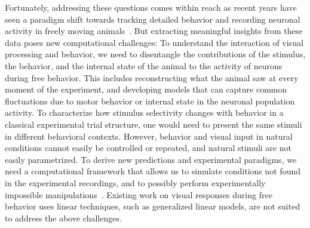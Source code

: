 \documentclass[COG,11pt]{ercgrant}
\begin{document}
Fortunately, addressing these questions comes within reach as recent years have seen a paradigm shift towards tracking detailed behavior and recording neuronal activity in freely moving animals~\parencite{Wallace2013-lf,Del_Grosso2017-ww,Mathis2018-lk,Cai2016-rh, Parker2022-ac}.
But extracting meaningful insights from these data poses new computational challenges:
 To understand the interaction of visual processing and behavior, we need to disentangle the contributions of the stimulus, the behavior, and the internal state of the animal to the activity of neurons during free behavior. 
This includes reconstructing what the animal saw at every moment of the experiment, and developing models that can capture common fluctuations due to motor behavior or internal state in the neuronal population activity.
 To characterize how stimulus selectivity changes with behavior in a classical experimental trial structure, one would need to present the same stimuli in different behavioral contexts. 
However, behavior and visual input in natural conditions cannot easily be controlled or repeated, and natural stimuli are not easily parametrized.
 To derive new predictions and experimental paradigms, we need a computational framework that allows us to simulate conditions not found in the experimental recordings, and to possibly perform experimentally impossible manipulations~\parencite{Walker2019-yw, Franke2022-do,Bashivan2019-ry}. Existing work on visual responses during free behavior uses linear techniques, such as generalized linear models, are not suited to address the above challenges.
\end{document}
